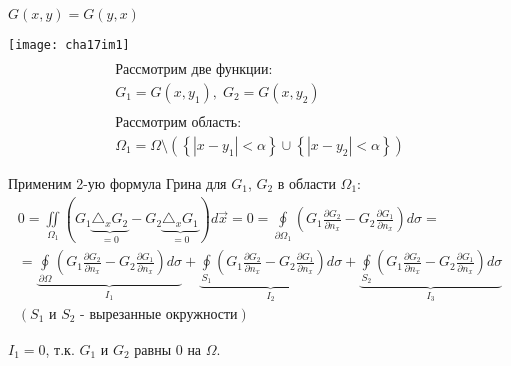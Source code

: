 \begin{theorem}
	$G(x, y) = G(y, x)$
\end{theorem}
\begin{Proof}
	\begin{multicols}{2}
		\texttt{[image: cha17im1]}
		\columnbreak
		$$\begin{gathered}
			\\
			\text{Рассмотрим две функции:}\\
			G_1 = G(x, y_1), \;  G_2 = G(x, y_2) \\ \\
			\text{Рассмотрим область:}\\
			\Omega_1 = \Omega \setminus (\left\{ {|x - y_1| < \alpha} \right\} \cup \left\{ {|x - y_2| < \alpha} \right\})
		\end{gathered}$$
	\end{multicols}

	Применим 2-ую формула Грина для $G_1$, $G_2$ в области $\Omega_1$:
	$$\begin{gathered}
		0 = \iint \limits_{\Omega_1} (G_1 \underbrace{\triangle_x G_2}_{ = 0} - G_2 \underbrace{\triangle_x G_1}_{ = 0}) d \vec{x} = 0 = \oint \limits_{\partial \Omega_1} \left(G_1 \frac{\partial G_2}{\partial n_x} - G_2 \frac{\partial G_1}{\partial n_x}\right) d \sigma = \\
		= \underbrace{\oint \limits_{\partial \Omega}\left(G_1 \frac{\partial G_2}{\partial n_x} - G_2 \frac{\partial G_1}{\partial n_x}\right) d \sigma}_{I_1} + \underbrace{\oint \limits_{S_1}\left(G_1 \frac{\partial G_2}{\partial n_x} - G_2 \frac{\partial G_1}{\partial n_x}\right) d \sigma}_{I_2} + \underbrace{\oint \limits_{S_2}\left(G_1 \frac{\partial G_2}{\partial n_x} - G_2 \frac{\partial G_1}{\partial n_x}\right) d \sigma }_{I_3}\\
		\left( S_1 \text{ и } S_2  \text{ - вырезанные окружности}\right)
	\end{gathered}$$

	$I_1 = 0$, т.к. $G_1$ и $G_2$ равны 0 на $\Omega$.


\end{Proof}
